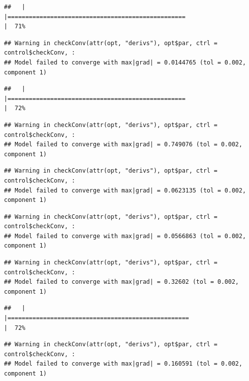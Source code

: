 \documentclass[
  12pt,
]{book}
\begin{document}
\begin{verbatim}
##   |                                                                              |==================================================                    |  71%
\end{verbatim}

\begin{verbatim}
## Warning in checkConv(attr(opt, "derivs"), opt$par, ctrl = control$checkConv, :
## Model failed to converge with max|grad| = 0.0144765 (tol = 0.002, component 1)
\end{verbatim}

\begin{verbatim}
##   |                                                                              |==================================================                    |  72%
\end{verbatim}

\begin{verbatim}
## Warning in checkConv(attr(opt, "derivs"), opt$par, ctrl = control$checkConv, :
## Model failed to converge with max|grad| = 0.749076 (tol = 0.002, component 1)
\end{verbatim}

\begin{verbatim}
## Warning in checkConv(attr(opt, "derivs"), opt$par, ctrl = control$checkConv, :
## Model failed to converge with max|grad| = 0.0623135 (tol = 0.002, component 1)
\end{verbatim}

\begin{verbatim}
## Warning in checkConv(attr(opt, "derivs"), opt$par, ctrl = control$checkConv, :
## Model failed to converge with max|grad| = 0.0566863 (tol = 0.002, component 1)
\end{verbatim}

\begin{verbatim}
## Warning in checkConv(attr(opt, "derivs"), opt$par, ctrl = control$checkConv, :
## Model failed to converge with max|grad| = 0.32602 (tol = 0.002, component 1)
\end{verbatim}

\begin{verbatim}
##   |                                                                              |===================================================                   |  72%
\end{verbatim}

\begin{verbatim}
## Warning in checkConv(attr(opt, "derivs"), opt$par, ctrl = control$checkConv, :
## Model failed to converge with max|grad| = 0.160591 (tol = 0.002, component 1)
\end{verbatim}
\end{document}
